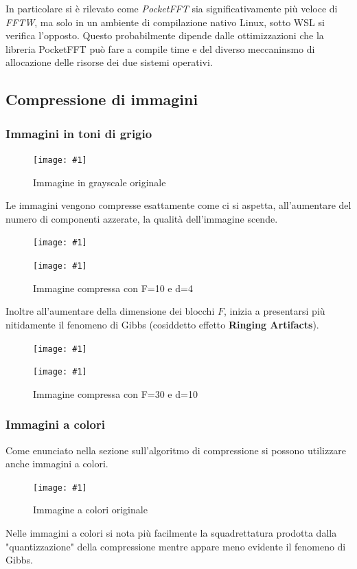 \documentclass[a4paper,11pt,oneside, table]{article}
\newcommand{\putimage}[4] {
	\begin{figure}[H]
	    \centering
	    \texttt{[image: \#1]}
	    \caption{#2}\label{#3}
	\end{figure}
}
\newcommand{\putsubimage}[5] {
  \begin{minipage}{{#4}\linewidth}
	    \centering
      \texttt{[image: \#1]}
	    \caption{#2}\label{#3}
	\end{minipage}
}
\newcommand{\putimagecouple}[2] {
  \begin{figure}[!htb]
      \centering
      #1
      \hspace{0.5cm}
      #2
  \end{figure}
}
\begin{document}
In particolare si \`e rilevato come \textit{PocketFFT} sia significativamente pi\`u veloce di \textit{FFTW}, ma solo in un ambiente di compilazione nativo Linux, sotto WSL si verifica l'opposto.
Questo probabilmente dipende dalle ottimizzazioni che la libreria PocketFFT pu\`o fare a compile time e del diverso meccaninsmo di allocazione delle risorse dei due sistemi operativi.
\subsection{Compressione di immagini}

\subsubsection{Immagini in toni di grigio}

\putimage{./images/compression-gs-original.png}{Immagine in grayscale originale}{png:compression-gs-original}{0.45}

Le immagini vengono compresse esattamente come ci si aspetta, all'aumentare del numero di componenti azzerate, la qualit\`a dell'immagine scende.

\putimagecouple
  {\putsubimage{./images/compression-gs-F10-d16.png}{Immagine compressa con F=10 e d=16}{png:compression-gs-F10-d16}{0.45}{0.99}}
  {\putsubimage{./images/compression-gs-F10-d4.png}{Immagine compressa con F=10 e d=4}{png:compression-gs-F10-d4}{0.45}{0.99}}

Inoltre all'aumentare della dimensione dei blocchi $F$, inizia a presentarsi pi\`u nitidamente il fenomeno di Gibbs (cosiddetto effetto \textbf{Ringing Artifacts}).

\putimagecouple
  {\putsubimage{./images/compression-gs-F30-d50.png}{Immagine compressa con F=30 e d=50}{png:compression-gs-F30-d50}{0.45}{0.99}}
  {\putsubimage{./images/compression-gs-F30-d10.png}{Immagine compressa con F=30 e d=10}{png:compression-gs-F30-d10}{0.45}{0.99}}

\subsubsection{Immagini a colori}

Come enunciato nella sezione sull'algoritmo di compressione si possono utilizzare anche immagini a colori.

\putimage{./images/compression-cl-original.png}{Immagine a colori originale}{png:compression-cl-original}{0.45}

Nelle immagini a colori si nota pi\`u facilmente la squadrettatura prodotta dalla "quantizzazione" della compressione mentre appare meno evidente il fenomeno di Gibbs.
\end{document}
